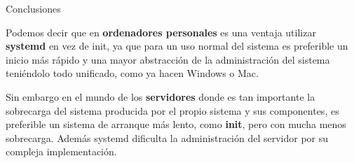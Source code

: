 \documentclass[11pt]{beamer}
\begin{document}
\begin{frame}{Conclusiones} %

Podemos decir que en \textbf{ordenadores personales} es una ventaja utilizar \textbf{systemd} en vez de init, ya que para un uso normal del sistema es preferible un inicio más rápido y una mayor abstracción de la administración del sistema teniéndolo todo unificado, como ya hacen Windows o Mac.

\vspace{0.5cm}

Sin embargo en el mundo de los \textbf{servidores} donde es tan importante la sobrecarga del sistema producida por el propio sistema y sus componentes, es preferible un sistema de arranque más lento, como \textbf{init}, pero con mucha menos sobrecarga. Además systemd dificulta la administración del servidor por su compleja implementación.

\end{frame}
\end{document}

